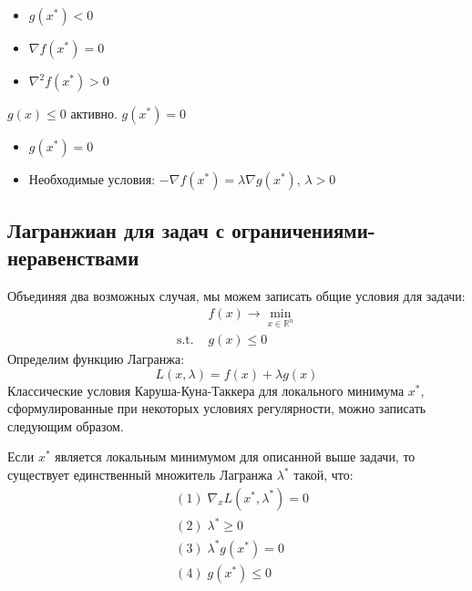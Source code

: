 \documentclass[
  russian,
  letterpaper,
  DIV=11,
  numbers=noendperiod]{scrartcl}
\providecommand{\tightlist}{%
  \setlength{\itemsep}{0pt}\setlength{\parskip}{0pt}}
\begin{document}
\begin{itemize}
\tightlist
\item
  \(g(x^*) < 0\)
\item
  \(\nabla f(x^*) = 0\)
\item
  \(\nabla^2 f(x^*) > 0\)
\end{itemize}

\(g(x) \leq 0\) активно. \(g(x^*) = 0\)

\begin{itemize}
\tightlist
\item
  \(g(x^*) = 0\)
\item
  Необходимые условия: \(- \nabla f(x^*) = \lambda \nabla g(x^*)\),
  \(\lambda > 0\)
\end{itemize}

\subsection{Лагранжиан для задач с
ограничениями-неравенствами}\label{ux43bux430ux433ux440ux430ux43dux436ux438ux430ux43d-ux434ux43bux44f-ux437ux430ux434ux430ux447-ux441-ux43eux433ux440ux430ux43dux438ux447ux435ux43dux438ux44fux43cux438-ux43dux435ux440ux430ux432ux435ux43dux441ux442ux432ux430ux43cux438}

Объединяя два возможных случая, мы можем записать общие условия для
задачи: \[
\begin{split}
& f(x) \to \min\limits_{x \in \mathbb{R}^n} \\
\text{s.t. } & g(x) \leq 0
\end{split}
\] Определим функцию Лагранжа: \[
L(x, \lambda) = f(x) + \lambda g(x)
\] Классические условия Каруша-Куна-Таккера для локального минимума
\(x^*\), сформулированные при некоторых условиях регулярности, можно
записать следующим образом.

Если \(x^*\) является локальным минимумом для описанной выше задачи, то
существует единственный множитель Лагранжа \(\lambda^*\) такой, что: \[
\begin{split}
& (1) \; \nabla_x L (x^*, \lambda^*) = 0\\
& (2) \; \lambda^* \geq 0\\
& (3) \; \lambda^* g(x^*) = 0\\
& (4) \; g(x^*) \leq 0\\
\end{split}
\]
\end{document}
